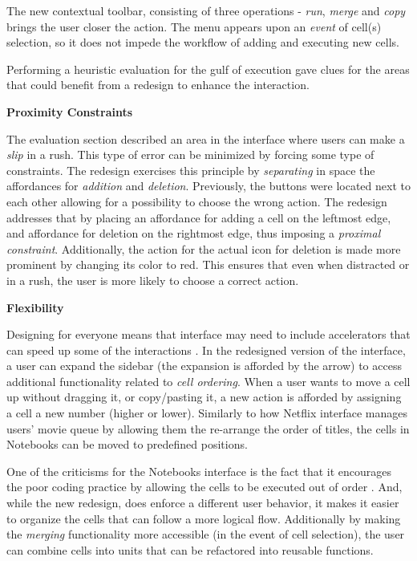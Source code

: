 \documentclass[12pt,letterpaper]{article}
\begin{document}
The new contextual toolbar, consisting of three operations - \textit{run}, \textit{merge} and \textit{copy} brings the user closer the action. The menu appears upon an \textit{event} of cell(s) selection, so it does not impede the workflow of adding and executing new cells. 

Performing a heuristic evaluation for the gulf of execution gave clues for the areas that could benefit from a redesign to enhance the interaction. 

\textbf{Proximity Constraints}

The evaluation section described an area in the interface where users can make a \textit{slip} in a rush. This type of error can be minimized by forcing some type of constraints. The redesign exercises this principle by \textit{separating} in space the affordances for \textit{addition} and \textit{deletion}. Previously, the buttons were located next to each other allowing for a possibility to choose the wrong action. The redesign addresses that by placing an affordance for adding a cell on the leftmost edge, and affordance for deletion on the rightmost edge, thus imposing a \textit{proximal constraint}.  Additionally, the action for the actual icon for deletion is made more prominent by changing its color to red. This ensures that even when distracted or in a rush, the user is more likely to choose a correct action.

\textbf{Flexibility}

Designing for everyone means that interface may need to include accelerators that can speed up some of the interactions \cite{nielsen1994usability}. In the redesigned version of the interface, a user can expand the sidebar (the expansion is afforded by the arrow) to access additional functionality related to \textit{cell ordering}. When a user wants to move a cell up without dragging it, or copy/pasting it, a new action is afforded by assigning a cell a new number (higher or lower). Similarly to how Netflix interface manages users' movie queue by allowing them the re-arrange the order of titles, the cells in Notebooks can be moved to predefined positions. 

One of the criticisms for the Notebooks interface is the fact that it encourages the poor coding practice by allowing the cells to be executed out of order \cite{perkel2018jupyter}. And, while the new redesign, does enforce a different user behavior, it makes it easier to organize the cells that can follow a more logical flow. Additionally by making the \textit{merging} functionality more accessible (in the event of cell selection), the user can combine cells into units that can be refactored into reusable functions. 
\end{document}
